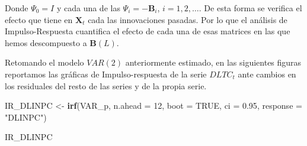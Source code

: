 \documentclass[
]{book}
\newenvironment{Shaded}{\begin{snugshade}}{\end{snugshade}}
\newcommand{\AttributeTok}[1]{\textcolor[rgb]{0.13,0.29,0.53}{#1}}
\newcommand{\ConstantTok}[1]{\textcolor[rgb]{0.56,0.35,0.01}{#1}}
\newcommand{\DecValTok}[1]{\textcolor[rgb]{0.00,0.00,0.81}{#1}}
\newcommand{\FloatTok}[1]{\textcolor[rgb]{0.00,0.00,0.81}{#1}}
\newcommand{\FunctionTok}[1]{\textcolor[rgb]{0.13,0.29,0.53}{\textbf{#1}}}
\newcommand{\NormalTok}[1]{#1}
\newcommand{\OtherTok}[1]{\textcolor[rgb]{0.56,0.35,0.01}{#1}}
\newcommand{\StringTok}[1]{\textcolor[rgb]{0.31,0.60,0.02}{#1}}
\begin{document}
Donde \(\Psi_0 = I\) y cada una de las \(\Psi_i = - \mathbf{B}_i\), \(i = 1, 2, \ldots\). De esta forma se verifica el efecto que tiene en \(\mathbf{X}_t\) cada las innovaciones pasadas. Por lo que el análisis de Impulso-Respuesta cuantifica el efecto de cada una de esas matrices en las que hemos descompuesto a \(\mathbf{B}(L)\).

Retomando el modelo \(VAR(2)\) anteriormente estimado, en las siguientes figuras reportamos las gráficas de Impulso-respuesta de la serie \(DLTC_t\) ante cambios en los residuales del resto de las series y de la propia serie.

\begin{Shaded}
\begin{Highlighting}[]
\NormalTok{IR\_DLINPC }\OtherTok{\textless{}{-}} \FunctionTok{irf}\NormalTok{(VAR\_p, }\AttributeTok{n.ahead =} \DecValTok{12}\NormalTok{, }\AttributeTok{boot =} \ConstantTok{TRUE}\NormalTok{, }
                 \AttributeTok{ci =} \FloatTok{0.95}\NormalTok{, }\AttributeTok{response =} \StringTok{"DLINPC"}\NormalTok{)}

\NormalTok{IR\_DLINPC}
\end{Highlighting}
\end{Shaded}
\end{document}
